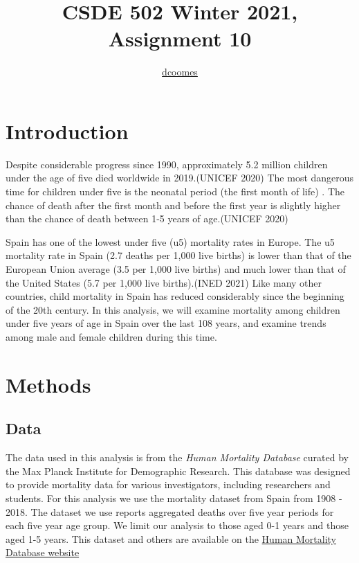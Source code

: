 \documentclass[]{article}
\title{CSDE 502 Winter 2021, Assignment 10}
\author{\href{mailto:dcoomes@uw.edu}{dcoomes}}
\date{}
\begin{document}
\maketitle

{
\hypersetup{linkcolor=black}
\setcounter{tocdepth}{2}
\tableofcontents
}
\section{Introduction}\label{introduction}

Despite considerable progress since 1990, approximately 5.2 million
children under the age of five died worldwide in 2019.(UNICEF 2020) The
most dangerous time for children under five is the neonatal period (the
first month of life) . The chance of death after the first month and
before the first year is slightly higher than the chance of death
between 1-5 years of age.(UNICEF 2020)

Spain has one of the lowest under five (u5) mortality rates in Europe.
The u5 mortality rate in Spain (2.7 deaths per 1,000 live births) is
lower than that of the European Union average (3.5 per 1,000 live
births) and much lower than that of the United States (5.7 per 1,000
live births).(INED 2021) Like many other countries, child mortality in
Spain has reduced considerably since the beginning of the 20th century.
In this analysis, we will examine mortality among children under five
years of age in Spain over the last 108 years, and examine trends among
male and female children during this time.

\section{Methods}\label{methods}

\subsection{Data}\label{data}

The data used in this analysis is from the \emph{Human Mortality
Database} curated by the Max Planck Institute for Demographic Research.
This database was designed to provide mortality data for various
investigators, including researchers and students. For this analysis we
use the mortality dataset from Spain from 1908 - 2018. The dataset we
use reports aggregated deaths over five year periods for each five year
age group. We limit our analysis to those aged 0-1 years and those aged
1-5 years. This dataset and others are available on the
\href{https://www.mortality.org}{Human Mortality Database website}
\end{document}

